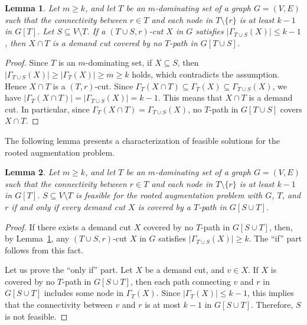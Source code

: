 \documentclass[11pt]{article}
\newtheorem{lemma}{Lemma}
\begin{document}
   \begin{lemma}\label{lem.Ucut}
    Let $m \geq k$,
    and let $T$ be an $m$-dominating set of a graph $G=(V,E)$
    such that the connectivity between $r \in T$ and each node in $T\setminus \{r\}$ is
    at least $k-1$ in $G[T]$.
  Let $S \subseteq V \setminus T$.
  If a $(T\cup S,r)$-cut $X$ in $G$ satisfies $|\Gamma_{T \cup
  S}(X)| \leq k-1$,
  then $X \cap T$ is a demand cut covered by no $T$-path in $G[T \cup S]$.
 \end{lemma}
   \begin{proof}
    Since $T$ is an $m$-dominating set, if $X \subseteq S$, 
   then $|\Gamma_{T\cup S}(X)| \geq |\Gamma_T(X)|\geq m \geq k$ holds,
   which contradicts the assumption.
   Hence $X \cap T$ is a $(T,r)$-cut.
  Since $\Gamma_T(X\cap T) \subseteq \Gamma_T(X) \subseteq  \Gamma_{T\cup S}(X)$,
    we have $|\Gamma_T(X\cap T)|= | \Gamma_{T\cup S}(X)|=k-1$.
    This means that $X\cap T$ is a demand cut.
    In particular, since $\Gamma_T(X\cap T)=\Gamma_{T \cup S}(X)$,
    no $T$-path in $G[T\cup S]$ covers $X\cap T$.
   \end{proof}

   The following lemma presents a characterization of feasible solutions
   for the rooted augmentation problem.
    \begin{lemma}
     \label{lem.feasibility}
         Let $m \geq k$,
    and let $T$ be an $m$-dominating set of a graph $G=(V,E)$
    such that the connectivity between  $r \in T$ and each node in $T\setminus \{r\}$ is at least
     $k-1$ in $G[T]$.
    $S \subseteq V\setminus T$ is feasible for the rooted augmentation
    problem with $G$, $T$, and $r$
    if and only if every demand cut $X$ is covered by a
    $T$-path in $G[S \cup T]$.
    \end{lemma}
     \begin{proof}
      If there exists a demand cut $X$ covered by no $T$-path in $G[S\cup T]$,
      then, by Lemma~\ref{lem.Ucut},
      any $(T\cup S,r)$-cut $X$ in $G$ satisfies $|\Gamma_{T \cup S}(X)| \geq k$.
      The ``if'' part follows from this fact.

      Let us prove the ``only if'' part.
     Let $X$ be a demand cut,
      and $v \in X$.
     If $X$ is covered by 
     no $T$-path in $G[S \cup T]$,
     then each path connecting $v$ and $r$  in $G[S \cup T]$ 
      includes some node in $\Gamma_T(X)$. Since $|\Gamma_T(X)|\leq k-1$,
     this implies that the connectivity between $v$ and $r$ is at most
     $k-1$ in $G[S\cup T]$.  Therefore, $S$ is not feasible.
     \end{proof}
\end{document}

